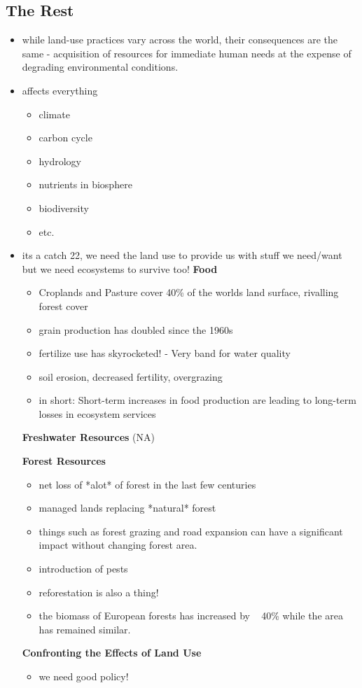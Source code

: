 \subsection*{The Rest}
\begin{itemize}
	\item while land-use practices vary across the world, their consequences are the same - acquisition of resources for immediate human needs at the expense of degrading environmental conditions.
	\item affects everything
	\begin{itemize}
		\item climate
		\item carbon cycle
		\item hydrology
		\item nutrients in biosphere
		\item biodiversity
		\item etc.
	\end{itemize}
	\item its a catch 22, we need the land use to provide us with stuff we need/want but we need ecosystems to survive too!
	\textbf{Food}
	\begin{itemize}
		\item Croplands and Pasture cover 40\% of the worlds land surface, rivalling forest cover
		\item grain production has doubled since the 1960s
		\item fertilize use has skyrocketed! - Very band for water quality
		\item soil erosion, decreased fertility, overgrazing
		\item in short: Short-term increases in food production are leading to long-term losses in ecosystem services
	\end{itemize}
	\textbf{Freshwater Resources} (NA)
	
	\textbf{Forest Resources}
	\begin{itemize}
		\item net loss of *alot* of forest in the last few centuries
		\item managed lands replacing *natural* forest 
		\item things such as forest grazing and road expansion can have a significant impact without changing forest area.
		\item introduction of pests
		\item reforestation is also a thing!
		\item the biomass of European forests has increased by ~ 40\% while the area has remained similar.
	\end{itemize}

	\textbf{Confronting the Effects of Land Use}
	\begin{itemize}
		\item we need good policy!
	\end{itemize}

\end{itemize}

